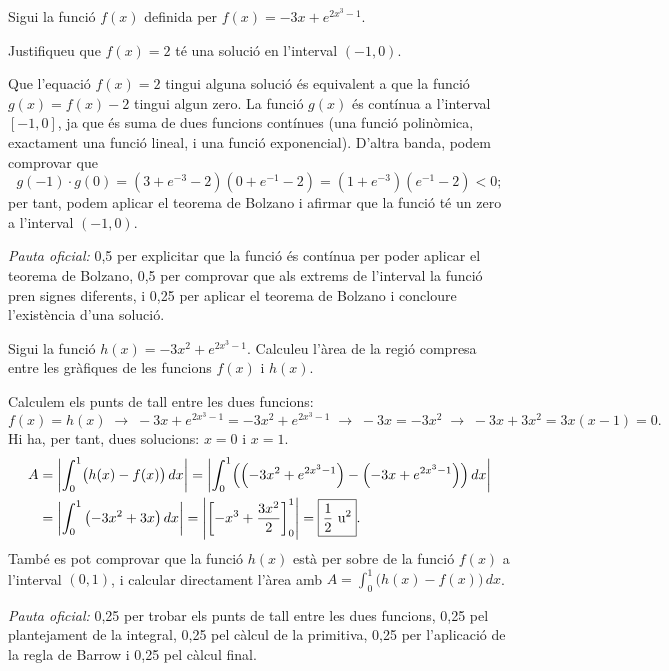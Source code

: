 Sigui la funció $f(x)$ definida per $f(x)=-3x+e^{2x^3-1}$.

\begin{apartats}

Justifiqueu que $f(x)=2$ té una solució en l'interval $(-1,0)$.

\begin{solucio}
Que l'equació $f(x)=2$ tingui alguna solució és equivalent a que la funció $g(x)=f(x)-2$ tingui algun zero. La
funció $g(x)$ és contínua a l'interval $[-1,0]$, ja que és suma de dues funcions contínues (una funció
polinòmica, exactament una funció lineal, i una funció exponencial). D'altra banda, podem comprovar que
\[
g(-1)\cdot g(0)=\left(3+e^{-3}-2\right)\left(0+e^{-1}-2\right)=\left(1+e^{-3}\right)\left(e^{-1}-2\right)<0;
\]
per tant, podem aplicar el teorema de Bolzano i afirmar que la funció té un zero a l'interval $(-1,0)$.

\textit{Pauta oficial:} 0,5 per explicitar que la funció és contínua per poder aplicar el teorema de Bolzano, 0,5
per comprovar que als extrems de l'interval la funció pren signes diferents, i 0,25 per aplicar el teorema de
Bolzano i concloure l'existència d'una solució.
\end{solucio}

Sigui la funció $h(x)=-3x^2+e^{2x^3-1}$. Calculeu l'àrea de la regió compresa entre les gràfiques de les funcions
$f(x)$ i $h(x)$.

\begin{solucio}
Calculem els punts de tall entre les dues funcions:
\[
f(x)=h(x)\;\rightarrow\;-3x+e^{2x^3-1}=-3x^2+e^{2x^3-1}\;\rightarrow\;-3x=-3x^2\;\rightarrow\;-3x+3x^2=3x(x-1)=0 .
\]
Hi ha, per tant, dues solucions: $x=0$ i $x=1$.
\begin{align*}
A&=\left|\int_0^1\bigl(h(x)-f(x)\bigr)\,dx\right|
=\left|\int_0^1\Bigl(\left(-3x^2+e^{2x^3-1}\right)-\left(-3x+e^{2x^3-1}\right)\Bigr)\,dx\right|\\
&=\left|\int_0^1\left(-3x^2+3x\right)dx\right|=\left|\left[-x^3+\frac{3x^2}{2}\right]_0^1\right|=\boxed{\frac12\ \text{u}^2}.
\end{align*}
També es pot comprovar que la funció $h(x)$ està per sobre de la funció $f(x)$ a l'interval $(0,1)$, i calcular
directament l'àrea amb $A=\int_0^1\bigl(h(x)-f(x)\bigr)\,dx$.

\textit{Pauta oficial:} 0,25 per trobar els punts de tall entre les dues funcions, 0,25 pel plantejament de la
integral, 0,25 pel càlcul de la primitiva, 0,25 per l'aplicació de la regla de Barrow i 0,25 pel càlcul final.
\end{solucio}

\end{apartats}
